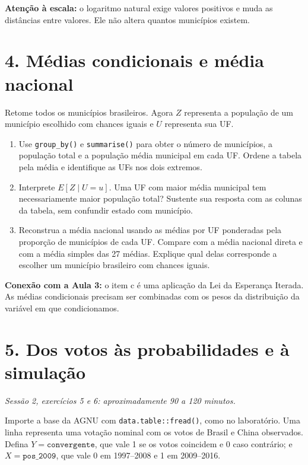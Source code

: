 \documentclass[
  brazilian,
  11pt,
  a4paper]{article}
\providecommand{\tightlist}{%
  \setlength{\itemsep}{0pt}\setlength{\parskip}{0pt}}
\begin{document}
\textbf{Atenção à escala:} o logaritmo natural exige valores positivos e
muda as distâncias entre valores. Ele não altera quantos municípios
existem.

\section{4. Médias condicionais e média
nacional}\label{muxe9dias-condicionais-e-muxe9dia-nacional}

Retome todos os municípios brasileiros. Agora \(Z\) representa a
população de um município escolhido com chances iguais e \(U\)
representa sua UF.

\begin{enumerate}
\def\labelenumi{\alph{enumi}.}
\tightlist
\item
  Use \texttt{group\_by()} e \texttt{summarise()} para obter o número de
  municípios, a população total e a população média municipal em cada
  UF. Ordene a tabela pela média e identifique as UFs nos dois extremos.
\item
  Interprete \(E[Z\mid U=u]\). Uma UF com maior média municipal tem
  necessariamente maior população total? Sustente sua resposta com as
  colunas da tabela, sem confundir estado com município.
\item
  Reconstrua a média nacional usando as médias por UF ponderadas pela
  proporção de municípios de cada UF. Compare com a média nacional
  direta e com a média simples das 27 médias. Explique qual delas
  corresponde a escolher um município brasileiro com chances iguais.
\end{enumerate}

\textbf{Conexão com a Aula 3:} o item c é uma aplicação da Lei da
Esperança Iterada. As médias condicionais precisam ser combinadas com os
pesos da distribuição da variável em que condicionamos.

\newpage

\section{5. Dos votos às probabilidades e à
simulação}\label{dos-votos-uxe0s-probabilidades-e-uxe0-simulauxe7uxe3o}

\emph{Sessão 2, exercícios 5 e 6: aproximadamente 90 a 120 minutos.}

Importe a base da AGNU com \texttt{data.table::fread()}, como no
laboratório. Uma linha representa uma votação nominal com os votos de
Brasil e China observados. Defina \(Y=\texttt{convergente}\), que vale 1
se os votos coincidem e 0 caso contrário; e \(X=\texttt{pos\_2009}\),
que vale 0 em 1997--2008 e 1 em 2009--2016.
\end{document}
